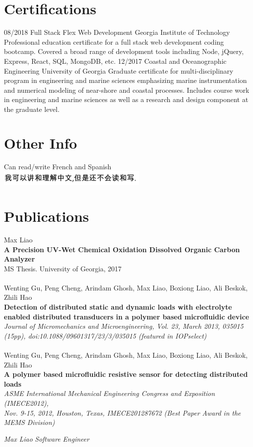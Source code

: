 \documentclass[]{resume}
\begin{document}
\section{Certifications}
\begin{entrylist}
\entry
    {08/2018}
    {Full Stack Flex Web Development}
    {Georgia Institute of Technology}
    {Professional education certificate for a full stack web development coding bootcamp. Covered a broad range of development tools including Node, jQuery, Express, React, SQL, MongoDB, etc.}
  \entry
    {12/2017}
    {Coastal and Oceanographic Engineering}
    {University of Georgia}
    {Graduate certificate for multi-disciplinary program in engineering and marine sciences emphasizing marine instrumentation and numerical modeling of near-shore and coastal processes. Includes course work in engineering and marine sciences as well as a research and design component at the graduate level.}
\end{entrylist}

\section{Other Info}
Can read/write French and Spanish\\
\emph{\includegraphics[scale=1]{img/Chinese.PNG}}\\
\section{Publications}
Max Liao\\ \textbf{A Precision UV-Wet Chemical Oxidation Dissolved Organic Carbon Analyzer}\\
MS Thesis. University of Georgia, 2017
\\\\
Wenting Gu, Peng Cheng, Arindam Ghosh, Max Liao, Boxiong Liao, Ali Beskok, Zhili Hao\\
\textbf{Detection of distributed static and dynamic loads with electrolyte enabled distributed transducers in a polymer based microfluidic device}\\
\emph{ Journal of Micromechanics and Microengineering, Vol. 23, March 2013, 035015 (15pp), doi:10.1088/09601317/23/3/035015 (featured in IOPselect) }
\\\\
 Wenting Gu, Peng Cheng, Arindam Ghosh, Max Liao, Boxiong Liao, Ali Beskok, Zhili Hao\\
\textbf{A polymer based microfluidic resistive sensor for detecting distributed loads}\\
\emph{ ASME International Mechanical Engineering Congress and Exposition (IMECE2012), \\ Nov. 9-15, 2012, Houston, Texas, IMECE201287672 (Best Paper Award in the MEMS Division) }
\\
\begin{flushleft}
\end{flushleft}
\begin{flushright}
\emph{Max Liao }
\emph{ Software Engineer}
\end{flushright}
\end{document}
